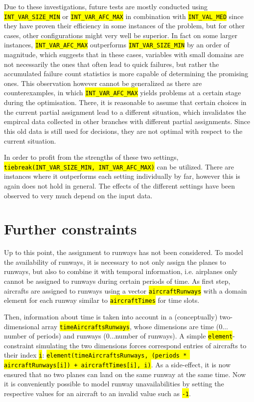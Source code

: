\documentclass[,%
			paper=a4,%
			DIV11,
			liststotoc,
			bibtotoc,
			draft=false,%
			numbers=noendperiod
			]{scrartcl}
\newcommand{\ilc}[1]{\hl{\texttt{#1}}}
\newcommand{\mymarginnote}[1]{\marginnote{\footnotesize{#1}}}
\begin{document}
Due to these investigations, future tests are mostly conducted using \ilc{INT\_VAR\_SIZE\_MIN} or \ilc{INT\_VAR\_AFC\_MAX} in combination with \ilc{INT\_VAL\_MED} since they have proven their efficiency in some instances of the problem, but for other cases, other configurations might very well be superior.
In fact on some larger instances, \ilc{INT\_VAR\_AFC\_MAX} outperforms \ilc{INT\_VAR\_SIZE\_MIN} by an order of magnitude, which suggests that in these cases, variables with small domains are not necessarily the ones that often lead to quick failures, but rather the accumulated failure count statistics is more capable of determining the promising ones.
This observation however cannot be generalized as there are counterexamples, in which \ilc{INT\_VAR\_AFC\_MAX} yields problems at a certain stage during the optimisation.
There, it is reasonable to assume that certain choices in the current partial assignment lead to a different situation, which invalidates the empircal data collected in other branches with different partial assignments. Since this old data is still used for decisions, they are not optimal with respect to the current situation.

In order to profit from the strengths of these two settings, \ilc{tiebreak(INT\_VAR\_SIZE\_MIN, INT\_VAR\_AFC\_MAX)} can be utilized. There are instances where it outperforms each setting individually by far, however this is again does not hold in general. The effects of the different settings have been observed to very much depend on the input data. 

\section{Further constraints}

\mymarginnote{\Crunway}
Up to this point, the assignment to runways has not been considered. 
To model the availability of runways, it is necessary to not only assign the planes to runways, but also to combine it with temporal information, i.e. airplanes only cannot be assigned to runways during certain periods of time.
As first step, aircrafts are assigned to runways using a vector \ilc{aircraftRunways} with a domain element for each runway similar to \ilc{aircraftTimes} for time slots. 

Then, information about time is taken into account in a (conceptually) two-dimensional array \ilc{timeAircraftsRunways}, whose dimensions are time ($0\dots$number of periods) and runways ($0\dots$number of runways).
A simple \ilc{element}-constraint simulating the two dimensions forces correspond entries of aircrafts to their index \ilc{i}: \ilc{element(timeAircraftsRunways, (periods * aircraftRunways[i]) + aircraftTimes[i], i)}.
As a side-effect, it is now ensured that no two planes can land on the same runway at the same time.
Now it is conveniently possible to model runway unavailabilities by setting the respective values for an aircraft to an invalid value such as \ilc{-1}.
\end{document}
